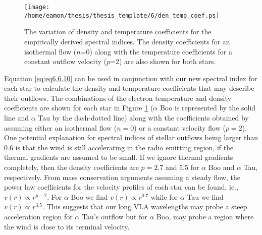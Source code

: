 \begin{figure}[hbt!]
\centering 
          \texttt{[image: /home/eamon/thesis/thesis\_template/6/den\_temp\_coef.ps]}
\caption[Variation of density and temperature coefficients for $\alpha$ Boo and $\alpha$ Tau.]{The variation of density and temperature coefficients for the empirically derived spectral indices. The density coefficients for an isothermal flow ($n$=0) along with the temperature coefficients for a constant outflow velocity ($p$=2) are also shown for both stars.}
\label{fig6.6.2}
\end{figure}

Equation \ref{eq:eq6.6.10} can be used in conjunction with our new spectral index for each star to calculate the density and temperature coefficients that may describe their outflows. The combinations of the electron temperature and density coefficients are shown for each star in Figure \ref{fig6.6.2} ($\alpha$ Boo is represented by the solid line and $\alpha$ Tau by the dash-dotted line) along with the coefficients obtained by assuming either an isothermal flow ($n=0$) or a constant velocity flow ($p=2$). One potential explanation for spectral indices of stellar outflows being larger than 0.6 is that the wind is still accelerating in the radio emitting region, if the thermal gradients are assumed to be small. If we ignore thermal gradients completely, then the density coefficients are $p  =2.7$ and 5.5 for $\alpha$ Boo and $\alpha$ Tau, respectively. From mass conservation arguments assuming a steady flow, the power law coefficients for the velocity profiles of each star can be found, ie., $v(r) \propto r^{p-2}$. For $\alpha$ Boo we find $v(r) \propto r^{0.7}$ while for $\alpha$ Tau we find $v(r) \propto r^{3.5}$. This suggests that our long VLA wavelengths may probe a steep acceleration region for $\alpha$ Tau's outflow but for $\alpha$ Boo, may probe a region where the wind is close to its terminal velocity. 

